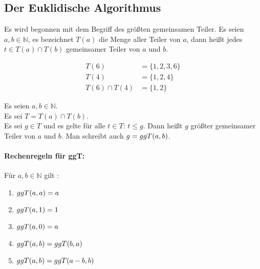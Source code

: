 \subsection{Der Euklidische Algorithmus}
Es wird begonnen mit dem Begriff des größten gemeinsamen Teiler.
Es seien $a,b \in  \mathbb{N}$, es bezeichnet $T(a)$ die Menge aller Teiler von $a$,
dann heißt jedes $t \in T(a) \cap T(b)$ gemeinsamer Teiler von $a$ und $b$.

\begin{example}
  \begin{align*}
    T(6)           & = \{1,2,3,6\} \\
    T(4)           & = \{1,2,4\}   \\
    T(6) \cap T(4) & = \{1,2\}
  \end{align*}
\end{example}

\begin{definition}
  Es seien $a,b \in \mathbb{N}$.\\
  Es sei $T = T(a) \cap T(b)$.\\
  Es sei $g \in T$ und es gelte für alle $t \in T$: $t \leq g$. Dann heißt $g$
  größter gemeinsamer Teiler von $a$ und $b$.
  Man schreibt auch $g = ggT(a,b)$.
\end{definition}

\paragraph{Rechenregeln für ggT:}
Für $a,b \in \mathbb{N}$ gilt \parencite{SITE:euklid}:
\begin{enumerate}[ref=(\arabic*)]
  \item $ggT(a,a) = a$ \label{enum:ggT1}
  \item $ggT(a,1) = 1$ \label{enum:ggT2}
  \item $ggT(a,0) = a$ \label{enum:ggT3}
  \item $ggT(a,b) = ggT(b,a)$ \label{enum:ggT4}
  \item $ggT(a,b) = ggT(a - b,b)$ \label{enum:ggT5}
\end{enumerate}

